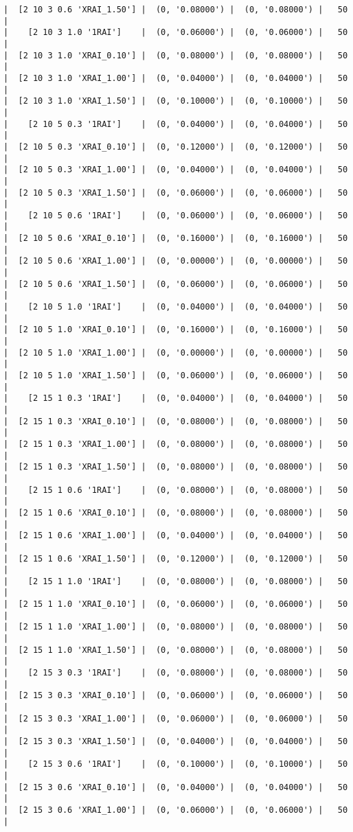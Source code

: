 \documentclass{article}
\begin{document}
\begin{verbatim}
|  [2 10 3 0.6 'XRAI_1.50'] |  (0, '0.08000') |  (0, '0.08000') |   50  |
|    [2 10 3 1.0 '1RAI']    |  (0, '0.06000') |  (0, '0.06000') |   50  |
|  [2 10 3 1.0 'XRAI_0.10'] |  (0, '0.08000') |  (0, '0.08000') |   50  |
|  [2 10 3 1.0 'XRAI_1.00'] |  (0, '0.04000') |  (0, '0.04000') |   50  |
|  [2 10 3 1.0 'XRAI_1.50'] |  (0, '0.10000') |  (0, '0.10000') |   50  |
|    [2 10 5 0.3 '1RAI']    |  (0, '0.04000') |  (0, '0.04000') |   50  |
|  [2 10 5 0.3 'XRAI_0.10'] |  (0, '0.12000') |  (0, '0.12000') |   50  |
|  [2 10 5 0.3 'XRAI_1.00'] |  (0, '0.04000') |  (0, '0.04000') |   50  |
|  [2 10 5 0.3 'XRAI_1.50'] |  (0, '0.06000') |  (0, '0.06000') |   50  |
|    [2 10 5 0.6 '1RAI']    |  (0, '0.06000') |  (0, '0.06000') |   50  |
|  [2 10 5 0.6 'XRAI_0.10'] |  (0, '0.16000') |  (0, '0.16000') |   50  |
|  [2 10 5 0.6 'XRAI_1.00'] |  (0, '0.00000') |  (0, '0.00000') |   50  |
|  [2 10 5 0.6 'XRAI_1.50'] |  (0, '0.06000') |  (0, '0.06000') |   50  |
|    [2 10 5 1.0 '1RAI']    |  (0, '0.04000') |  (0, '0.04000') |   50  |
|  [2 10 5 1.0 'XRAI_0.10'] |  (0, '0.16000') |  (0, '0.16000') |   50  |
|  [2 10 5 1.0 'XRAI_1.00'] |  (0, '0.00000') |  (0, '0.00000') |   50  |
|  [2 10 5 1.0 'XRAI_1.50'] |  (0, '0.06000') |  (0, '0.06000') |   50  |
|    [2 15 1 0.3 '1RAI']    |  (0, '0.04000') |  (0, '0.04000') |   50  |
|  [2 15 1 0.3 'XRAI_0.10'] |  (0, '0.08000') |  (0, '0.08000') |   50  |
|  [2 15 1 0.3 'XRAI_1.00'] |  (0, '0.08000') |  (0, '0.08000') |   50  |
|  [2 15 1 0.3 'XRAI_1.50'] |  (0, '0.08000') |  (0, '0.08000') |   50  |
|    [2 15 1 0.6 '1RAI']    |  (0, '0.08000') |  (0, '0.08000') |   50  |
|  [2 15 1 0.6 'XRAI_0.10'] |  (0, '0.08000') |  (0, '0.08000') |   50  |
|  [2 15 1 0.6 'XRAI_1.00'] |  (0, '0.04000') |  (0, '0.04000') |   50  |
|  [2 15 1 0.6 'XRAI_1.50'] |  (0, '0.12000') |  (0, '0.12000') |   50  |
|    [2 15 1 1.0 '1RAI']    |  (0, '0.08000') |  (0, '0.08000') |   50  |
|  [2 15 1 1.0 'XRAI_0.10'] |  (0, '0.06000') |  (0, '0.06000') |   50  |
|  [2 15 1 1.0 'XRAI_1.00'] |  (0, '0.08000') |  (0, '0.08000') |   50  |
|  [2 15 1 1.0 'XRAI_1.50'] |  (0, '0.08000') |  (0, '0.08000') |   50  |
|    [2 15 3 0.3 '1RAI']    |  (0, '0.08000') |  (0, '0.08000') |   50  |
|  [2 15 3 0.3 'XRAI_0.10'] |  (0, '0.06000') |  (0, '0.06000') |   50  |
|  [2 15 3 0.3 'XRAI_1.00'] |  (0, '0.06000') |  (0, '0.06000') |   50  |
|  [2 15 3 0.3 'XRAI_1.50'] |  (0, '0.04000') |  (0, '0.04000') |   50  |
|    [2 15 3 0.6 '1RAI']    |  (0, '0.10000') |  (0, '0.10000') |   50  |
|  [2 15 3 0.6 'XRAI_0.10'] |  (0, '0.04000') |  (0, '0.04000') |   50  |
|  [2 15 3 0.6 'XRAI_1.00'] |  (0, '0.06000') |  (0, '0.06000') |   50  |

\end{verbatim}
\end{document}
